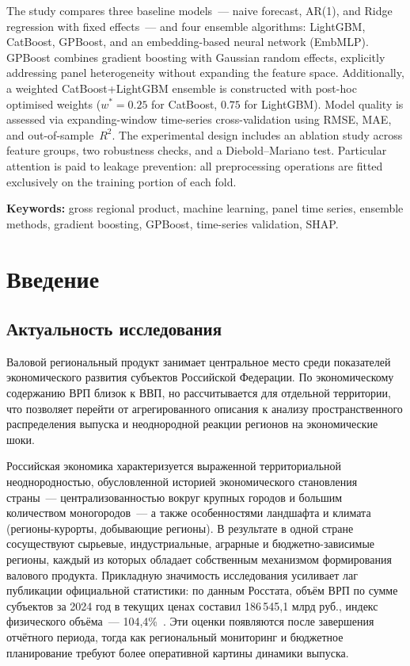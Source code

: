 \documentclass[12pt,a4paper]{article}
\begin{document}
The study compares three baseline models~--- naive forecast, AR(1), and Ridge
regression with fixed effects~--- and four ensemble algorithms: LightGBM,
CatBoost, GPBoost, and an embedding-based neural network (EmbMLP).
GPBoost combines gradient boosting with Gaussian random effects, explicitly
addressing panel heterogeneity without expanding the feature space.
Additionally, a weighted CatBoost+LightGBM ensemble is constructed with
post-hoc optimised weights ($w^*=0{.}25$ for CatBoost, $0{.}75$ for LightGBM).
Model quality is assessed via expanding-window time-series cross-validation
using RMSE, MAE, and out-of-sample~$R^2$. The experimental design includes an
ablation study across feature groups, two robustness checks, and a
Diebold--Mariano test. Particular attention is paid to leakage prevention: all
preprocessing operations are fitted exclusively on the training portion of each
fold.

\smallskip\noindent
\textbf{Keywords:} gross regional product, machine learning, panel time series,
ensemble methods, gradient boosting, GPBoost, time-series validation, SHAP.

\newpage
\tableofcontents

\newpage
\section{Введение}

\subsection{Актуальность исследования}

Валовой региональный продукт занимает центральное место среди показателей
экономического развития субъектов Российской Федерации. По экономическому
содержанию ВРП близок к ВВП, но рассчитывается для отдельной территории,
что позволяет перейти от агрегированного описания к анализу пространственного
распределения выпуска и неоднородной реакции регионов на экономические шоки.

Российская экономика характеризуется выраженной территориальной
неоднородностью, обусловленной историей экономического становления
страны~--- централизованностью вокруг крупных городов и большим количеством
моногородов~--- а также особенностями ландшафта и климата (регионы-курорты,
добывающие регионы). В результате в одной стране сосуществуют сырьевые,
индустриальные, аграрные и бюджетно-зависимые регионы, каждый из которых
обладает собственным механизмом формирования валового продукта.
Прикладную значимость исследования усиливает лаг публикации официальной
статистики: по данным Росстата, объём ВРП по сумме субъектов за 2024 год
в текущих ценах составил 186\,545,1 млрд руб., индекс физического
объёма~--- 104,4\%~\cite{rosstat2024}. Эти оценки появляются после завершения
отчётного периода, тогда как региональный мониторинг и бюджетное планирование
требуют более оперативной картины динамики выпуска.
\end{document}

